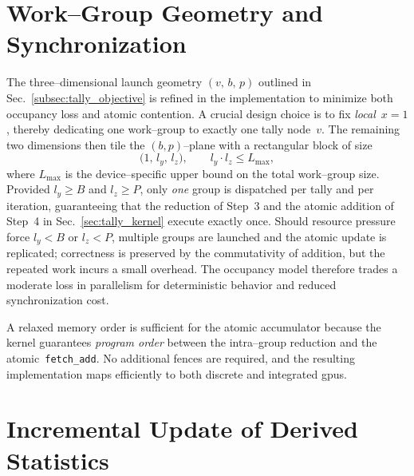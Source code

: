 
\section{Work--Group Geometry and Synchronization}
\label{subsec:tally_geometry}

The three--dimensional launch geometry \((v,\,b,\,p)\) outlined in
Sec.~\ref{subsec:tally_objective} is refined in the implementation to minimize
both occupancy loss and atomic contention.  A crucial design choice is to fix
\emph{local}~\(x=1\), thereby dedicating one work--group to exactly one tally
node~\(v\).  The remaining two dimensions then tile the \((b,p)\)--plane with a
rectangular block of size
\[
  \bigl(1,\,l_y,\,l_z\bigr),
  \qquad l_y\cdot l_z\le L_{\max},
\]
where \(L_{\max}\) is the device--specific upper bound on the total work--group
size.  Provided \(l_y\!\ge\!B\) and \(l_z\!\ge\!P\), only \emph{one} group is
dispatched per tally and per iteration, guaranteeing that the reduction of
Step~3 and the atomic addition of Step~4 in
Sec.~\ref{sec:tally_kernel} execute exactly once.  Should resource pressure
force \(l_y< B\) or \(l_z< P\), multiple groups are launched and the atomic
update is replicated; correctness is preserved by the commutativity of
addition, but the repeated work incurs a small overhead.  The occupancy model
therefore trades a moderate loss in parallelism for deterministic behavior and
reduced synchronization cost.

A relaxed memory order is sufficient for the atomic accumulator because the
kernel guarantees \emph{program order} between the intra--group reduction and
the atomic~\texttt{fetch\_add}.  No additional fences are required, and the
resulting implementation maps efficiently to both discrete and integrated
\acrshort{gpu}s.

\section{Incremental Update of Derived Statistics}
\label{subsec:tally_stats_refresh}

